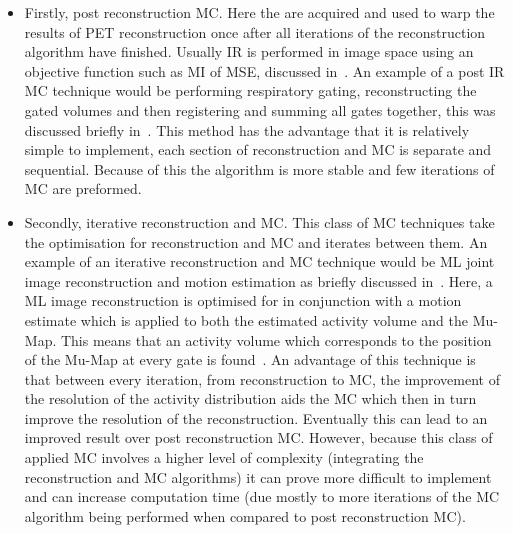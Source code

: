             \begin{itemize}
                \item Firstly, post reconstruction \gls{MC}. Here the  are acquired and used to warp the results of \gls{PET} reconstruction once after all iterations of the reconstruction algorithm have finished. Usually \gls{IR} is performed in image space using an objective function such as \gls{MI} of \gls{MSE}, discussed in~. An example of a post \gls{IR} \gls{MC} technique would be performing respiratory gating, reconstructing the gated volumes and then registering and summing all gates together, this was discussed briefly in~. This method has the advantage that it is relatively simple to implement, each section of reconstruction and \gls{MC} is separate and sequential. Because of this the algorithm is more stable and few iterations of \gls{MC} are preformed.
                
                \item Secondly, iterative reconstruction and \gls{MC}. This class of \gls{MC} techniques take the optimisation for reconstruction and \gls{MC} and iterates between them. An example of an iterative reconstruction and \gls{MC} technique would be \gls{ML} joint image reconstruction and motion estimation as briefly discussed in~. Here, a \gls{ML} image reconstruction is optimised for in conjunction with a motion estimate which is applied to both the estimated activity volume and the \gls{Mu-Map}. This means that an activity volume which corresponds to the position of the \gls{Mu-Map} at every gate is found~. An advantage of this technique is that between every iteration, from reconstruction to \gls{MC}, the improvement of the resolution of the activity distribution aids the \gls{MC} which then in turn improve the resolution of the reconstruction. Eventually this can lead to an improved result over post reconstruction \gls{MC}. However, because this class of applied \gls{MC} involves a higher level of complexity (integrating the reconstruction and \gls{MC} algorithms) it can prove more difficult to implement and can increase computation time (due mostly to more iterations of the \gls{MC} algorithm being performed when compared to post reconstruction \gls{MC}).
            \end{itemize}
    
        
